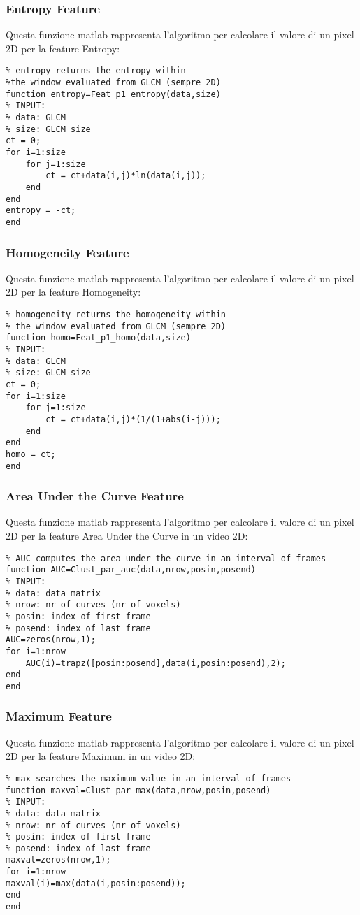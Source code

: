 \subsubsection{Entropy Feature}
\label{entropycode}
Questa funzione matlab rappresenta l'algoritmo per calcolare il valore di un pixel 2D per la feature Entropy:
\begin{lstlisting}
% entropy returns the entropy within 
%the window evaluated from GLCM (sempre 2D)
function entropy=Feat_p1_entropy(data,size)
% INPUT: 
% data: GLCM
% size: GLCM size
ct = 0;
for i=1:size
	for j=1:size
		ct = ct+data(i,j)*ln(data(i,j));
	end
end
entropy = -ct;
end
\end{lstlisting}
\subsubsection{Homogeneity Feature}
\label{homogeneitycode}
Questa funzione matlab rappresenta l'algoritmo per calcolare il valore di un pixel 2D per la feature Homogeneity:
\begin{lstlisting}
% homogeneity returns the homogeneity within
% the window evaluated from GLCM (sempre 2D)
function homo=Feat_p1_homo(data,size)
% INPUT: 
% data: GLCM
% size: GLCM size
ct = 0;
for i=1:size
	for j=1:size
		ct = ct+data(i,j)*(1/(1+abs(i-j)));
	end
end
homo = ct;
end
\end{lstlisting}

\subsubsection{Area Under the Curve Feature}
\label{auccode}
Questa funzione matlab rappresenta l'algoritmo per calcolare il valore di un pixel 2D per la feature Area Under the Curve in un video 2D:
\begin{lstlisting}
% AUC computes the area under the curve in an interval of frames 
function AUC=Clust_par_auc(data,nrow,posin,posend)
% INPUT: 
% data: data matrix
% nrow: nr of curves (nr of voxels)
% posin: index of first frame
% posend: index of last frame
AUC=zeros(nrow,1);
for i=1:nrow
    AUC(i)=trapz([posin:posend],data(i,posin:posend),2);
end
end
\end{lstlisting}
\subsubsection{Maximum Feature}
\label{maximumcode}
Questa funzione matlab rappresenta l'algoritmo per calcolare il valore di un pixel 2D per la feature Maximum in un video 2D:
\begin{lstlisting}
% max searches the maximum value in an interval of frames 
function maxval=Clust_par_max(data,nrow,posin,posend)
% INPUT: 
% data: data matrix
% nrow: nr of curves (nr of voxels)
% posin: index of first frame
% posend: index of last frame
maxval=zeros(nrow,1);
for i=1:nrow
maxval(i)=max(data(i,posin:posend));
end
end
\end{lstlisting}
